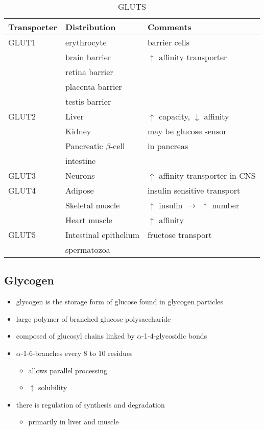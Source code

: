 \documentclass{scrartcl}
\begin{document}
\begin{table}[htbp]
\caption[GLUTS]{\label{tab:org0550ba9}
GLUTS}
\centering
\begin{tabular}{lll}
Transporter & Distribution & Comments\\
\hline
GLUT1 & erythrocyte & barrier cells\\
 & brain barrier & \(\uparrow\) affinity transporter\\
 & retina barrier & \\
 & placenta barrier & \\
 & testis barrier & \\
\hline
GLUT2 & Liver & \(\uparrow\) capacity, \(\downarrow\) affinity\\
 & Kidney & may be glucose sensor\\
 & Pancreatic \(\beta\)-cell & in pancreas\\
 & intestine & \\
\hline
GLUT3 & Neurons & \(\uparrow\) affinity  transporter in CNS\\
\hline
GLUT4 & Adipose & insulin sensitive transport\\
 & Skeletal muscle & \(\uparrow\) insulin \(\to\) \(\uparrow\) number\\
 & Heart muscle & \(\uparrow\) affinity\\
\hline
GLUT5 & Intestinal epithelium & fructose transport\\
 & spermatozoa & \\
\end{tabular}
\end{table}

\subsection{Glycogen}
\label{sec:org3c6cb5f}
\begin{itemize}
\item glycogen is the storage form of glucose found in glycogen particles
\item large polymer of branched glucose polysaccharide
\item composed of glucosyl chains linked by \(\alpha\)-1-4-glycosidic bonds
\item \(\alpha\)-1-6-branches every 8 to 10 residues
\begin{itemize}
\item allows parallel processing
\item \(\uparrow\) solubility
\end{itemize}

\item there is regulation of synthesis and degradation
\begin{itemize}
\item primarily in liver and muscle
\end{itemize}
\end{itemize}
\end{document}
